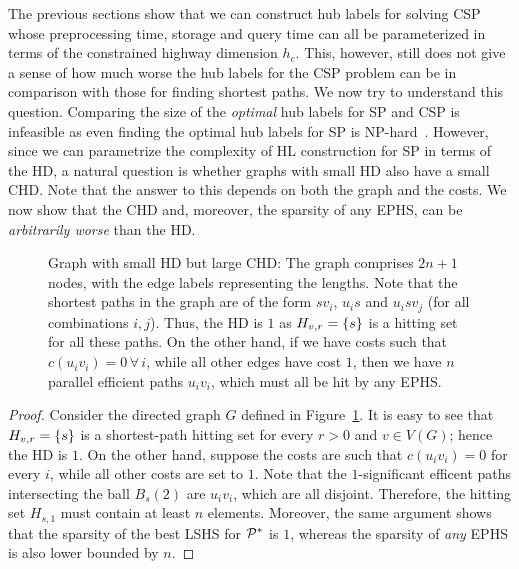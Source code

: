 The previous sections show that we can construct hub labels for solving CSP whose preprocessing time, storage and query time can all be parameterized in terms of the constrained highway dimension $h_c$. 
This, however, still does not give a sense of how much worse the hub labels for the CSP problem can be in comparison with those for finding shortest paths. 
We now try to understand this question.
Comparing the size of the \emph{optimal} hub labels for SP and CSP is infeasible as even finding the optimal hub labels for SP is NP-hard~\cite{babenko_hl_complexity}. 
However, since we can parametrize the complexity of HL construction for SP in terms of the HD, a natural question is whether graphs with small HD also have a small CHD. 
Note that the answer to this depends on both the graph and the costs.
We now show that the CHD and, moreover, the sparsity of any EPHS, can be \emph{arbitrarily worse} than the HD. 
\begin{figure}
	
	\caption{Graph with small HD but large CHD: The graph comprises $2n+1$ nodes, with the edge labels representing the lengths. Note that the shortest paths in the graph are of the form $sv_i$, $u_is$ and $u_isv_j$ (for all combinations $i,j$). Thus, the HD is $1$ as $H_{v,r}=\{s\}$ is a hitting set for all these paths. On the other hand, if we have costs such that $c(u_iv_i)=0\,\forall\,i$, while all other edges have cost $1$, then we have $n$ parallel efficient paths $u_iv_i$, which must all be hit by any EPHS.}
	\label{fig:big_chd}
\end{figure}
\begin{proof}
	Consider the directed graph $G$ defined in Figure~\ref{fig:big_chd}.
	It is easy to see that $H_{v,r}=\{s\}$ is a shortest-path hitting set for every $r>0$ and $v\in V(G)$; hence the HD is $1$.
	On the other hand, suppose the costs are such that $c(u_iv_i)=0$ for every $i$, while all other costs are set to $1$.
	Note that the $1$-significant efficent paths intersecting the ball $B_s(2)$ are $u_iv_i$, which are all disjoint.
	Therefore, the hitting set $H_{s,1}$ must contain at least $n$ elements. Moreover, the same argument shows that the sparsity of the best LSHS for $\mathcal{P}^*$ is $1$, whereas the sparsity of \emph{any} EPHS is also lower bounded by $n$.
\end{proof}

